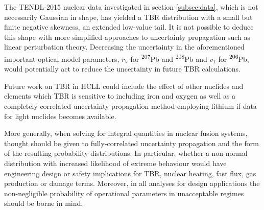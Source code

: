 The TENDL-2015 nuclear data investigated in section \ref{subsec:data}, which is not necessarily Gaussian in shape, has yielded a TBR distribution with a small but finite negative skewness, an extended low-value tail. It is not possible to deduce this shape with more simplified approaches to uncertainty propagation such as linear perturbation theory. Decreasing the uncertainty in the aforementioned important optical model parameters, $r_{V}$ for \textsuperscript{207}Pb and \textsuperscript{208}Pb and $v_{1}$ for \textsuperscript{206}Pb, would potentially act to reduce the uncertainty in future TBR calculations.

Future work on TBR in HCLL could include the effect of other nuclides and elements which TBR is sensitive to including iron and oxygen as well as a completely correlated uncertainty propagation method employing lithium if data for light nuclides becomes available.

More generally, when solving for integral quantities in nuclear fusion systems, thought should be given to fully-correlated uncertainty propagation and the form of the resulting probability distributions. In particular, whether a non-normal distribution with increased likelihood of extreme behaviour would have engineering design or safety implications for TBR, nuclear heating, fast flux, gas production or damage terms. Moreover, in all analyses for design applications the non-negligible probability of operational parameters in unacceptable regimes should be borne in mind.

